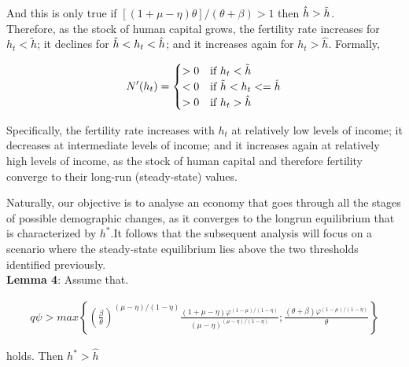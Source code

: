 And this is only true if  $[(1+\mu - \eta )\theta]/(\theta + \beta)>1$ then $\hat{h} > \Tilde{h}$. \\

Therefore, as the stock of human capital grows, the fertility rate increases for $h_t < \tilde{h}$; it declines for $\Tilde{h} < h_t < \hat{h}$; and it increases again for $h_t > \hat{h}$.
Formally,

    \begin{equation}
    \begin{aligned}
    N'(h_t) = \begin{cases}
                    > 0     & \text{if } h_t < \Tilde{h} \\
                    < 0     & \text{if } \Tilde{h} < h_t <= \hat{h} \\
                    > 0     & \text{if } h_t > \hat{h} \\
                    \end{cases}
    \end{aligned}
    \end{equation}
    
Specifically, the fertility rate increases with $h_t$ at relatively low levels of income; it decreases at intermediate levels of income; and it increases again at relatively high levels of income, as the stock of human capital and therefore fertility converge to their long-run (steady-state) values.

Naturally, our objective is to analyse an economy that goes through all the stages of possible demographic changes, as it converges to the longrun equilibrium that is characterized by $h^{*}$.It follows that the subsequent
analysis will focus on a scenario where the steady-state equilibrium lies
above the two thresholds identified previously. \\
\textbf{Lemma 4}: Assume that.

    \begin{equation}
    \begin{aligned}
    q\psi > max \left\{ \left(\frac{\beta}{\theta}\right)^{(\mu - \eta)/(1-\eta)} \frac{(1+\mu -\eta)\varphi^{(1-\mu)/(1-\eta)}}{(\mu - \eta)^{(\mu - \eta)/(1-\eta)}};\frac{(\theta + \beta) \varphi^{(1-\mu)/(1-\eta)}}{\theta} \right\}
    \end{aligned}
    \end{equation}
    
holds. Then $h^{*} > \hat{h}$ \\

